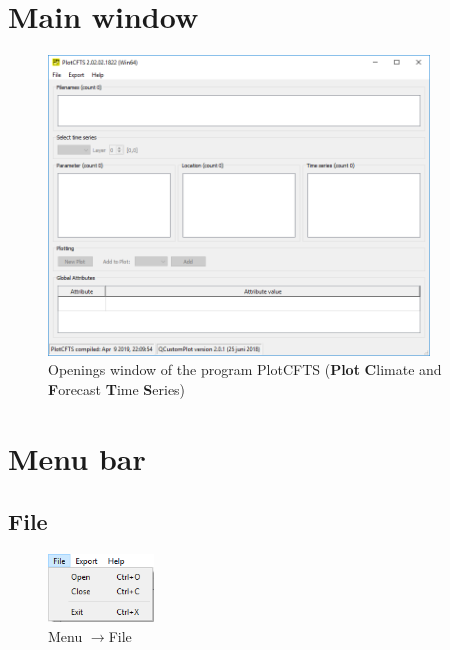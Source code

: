 \documentclass{deltares_memo}
\newcommand{\menuarrow}{$\rightarrow$}
\begin{document}
\section{Main window}
\begin{figure}[H]
    \centering    
        \includegraphics[width=0.9\textwidth]{pictures/main.png}
    \caption{Openings window of the program PlotCFTS (\textbf{Plot} \textbf{C}limate and \textbf{F}orecast \textbf{T}ime \textbf{S}eries)}
\end{figure}
\section{Menu bar}
\subsection{File}
\begin{figure}[H]
    \centering    
    \includegraphics[width=0.25\textwidth]{pictures/menu_file.png}
    \caption{Menu \menuarrow File}
\end{figure}
\end{document}
